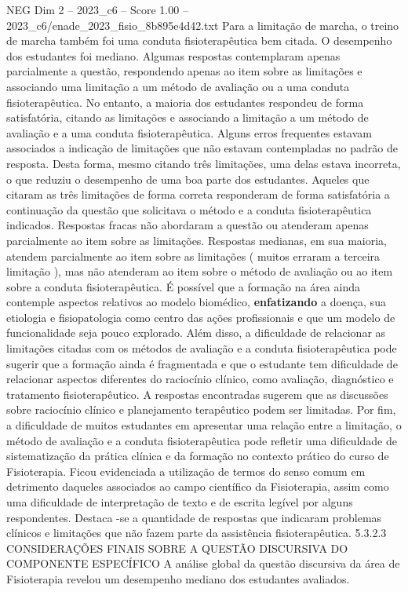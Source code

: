 \begin{textsample}{NEG Dim 2 – 2023\_c6 – Score 1.00 – 2023\_c6/enade\_2023\_fisio\_8b895e4d42.txt}
Para a limitação de marcha, o treino de marcha também foi uma conduta fisioterapêutica bem citada.
O desempenho dos estudantes foi mediano.
Algumas respostas contemplaram apenas parcialmente a questão, respondendo apenas ao item sobre as limitações e associando uma limitação a um método de avaliação ou a uma conduta fisioterapêutica.
No entanto, a maioria dos estudantes respondeu de forma satisfatória, citando as limitações e associando a limitação a um método de avaliação e a uma conduta fisioterapêutica.
Alguns erros frequentes estavam associados a indicação de limitações que não estavam contempladas no padrão de resposta.
Desta forma, mesmo citando três limitações, uma delas estava incorreta, o que reduziu o desempenho de uma boa parte dos estudantes.
Aqueles que citaram as três limitações de forma correta responderam de forma satisfatória a continuação da questão que solicitava o método e a conduta fisioterapêutica indicados.
Respostas fracas não abordaram a questão ou atenderam apenas parcialmente ao item sobre as limitações.
Respostas medianas, em sua maioria, atendem parcialmente ao item sobre as limitações ( muitos erraram a terceira limitação ), mas não atenderam ao item sobre o método de avaliação ou ao item sobre a conduta fisioterapêutica.
É possível que a formação na área ainda contemple aspectos relativos ao modelo biomédico, \textbf{enfatizando} a doença, sua etiologia e fisiopatologia como centro das ações profissionais e que um modelo de funcionalidade seja pouco explorado.
Além disso, a dificuldade de relacionar as limitações citadas com os métodos de avaliação e a conduta fisioterapêutica pode sugerir que a formação ainda é fragmentada e que o estudante tem dificuldade de relacionar aspectos diferentes do raciocínio clínico, como avaliação, diagnóstico e tratamento fisioterapêutico.
A respostas encontradas sugerem que as discussões sobre raciocínio clínico e planejamento terapêutico podem ser limitadas.
Por fim, a dificuldade de muitos estudantes em apresentar uma relação entre a limitação, o método de avaliação e a conduta fisioterapêutica pode refletir uma dificuldade de sistematização da prática clínica e da formação no contexto prático do curso de Fisioterapia.
Ficou evidenciada a utilização de termos do senso comum em detrimento daqueles associados ao campo científico da Fisioterapia, assim como uma dificuldade de interpretação de texto e de escrita legível por alguns respondentes.
Destaca -se a quantidade de respostas que indicaram problemas clínicos e limitações que não fazem parte da assistência fisioterapêutica. 5.3.2.3 CONSIDERAÇÕES FINAIS SOBRE A QUESTÃO DISCURSIVA DO COMPONENTE ESPECÍFICO A análise global da questão discursiva da área de Fisioterapia revelou um desempenho mediano dos estudantes avaliados.

\end{textsample}
